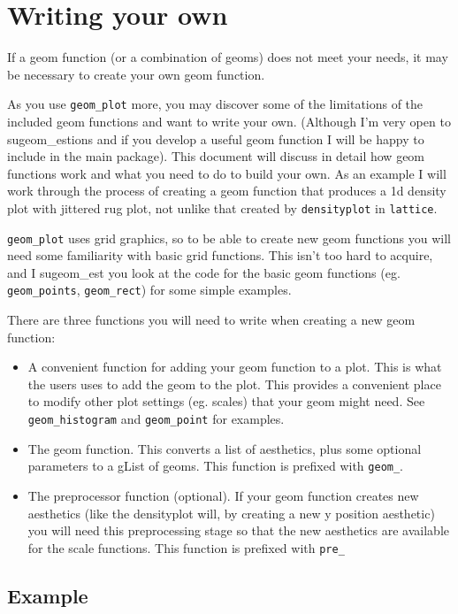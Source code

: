 
\section{Writing your own}\label{sec:writing_your_own}

If a geom function (or a combination of geoms) does not meet your needs, it may be necessary to create your own geom function.  

As you use \texttt{geom_plot} more, you may discover some of the limitations of the included geom functions and want to write your own.  (Although I'm very open to sugeom_estions and if you develop a useful geom function I will be happy to include in the main package).  This document will discuss in detail how geom functions work and what you need to do to build your own.  As an example I will work through the process of creating a geom function that produces a 1d density plot with jittered rug plot, not unlike that created by \texttt{densityplot} in \texttt{lattice}.

\texttt{geom_plot} uses grid graphics, so to be able to create new geom functions you will need some familiarity with basic grid functions.  This isn't too hard to acquire, and I sugeom_est you look at the code for the basic geom functions (eg. \texttt{geom\_points}, \texttt{geom\_rect}) for some simple examples.

There are three functions you will need to write when creating a new geom function:

\begin{itemize}
	\item A convenient function for adding your geom function to a plot.  This is what the users uses to add the geom to the plot.  This provides a convenient place to modify other plot settings (eg. scales) that your geom might need.  See \texttt{geom_histogram} and \texttt{geom_point} for examples.
	\item The geom function.  This converts a list of aesthetics, plus some optional parameters to a gList of geoms.  This function is prefixed with \texttt{geom\_}.  
	\item The preprocessor function (optional).  If your geom function creates new aesthetics (like the densityplot will, by creating a new y position aesthetic) you will need this preprocessing stage so that the new aesthetics are available for the scale functions.  This function is prefixed with \texttt{pre\_}
\end{itemize}

\subsection{Example}\label{sub:example}

